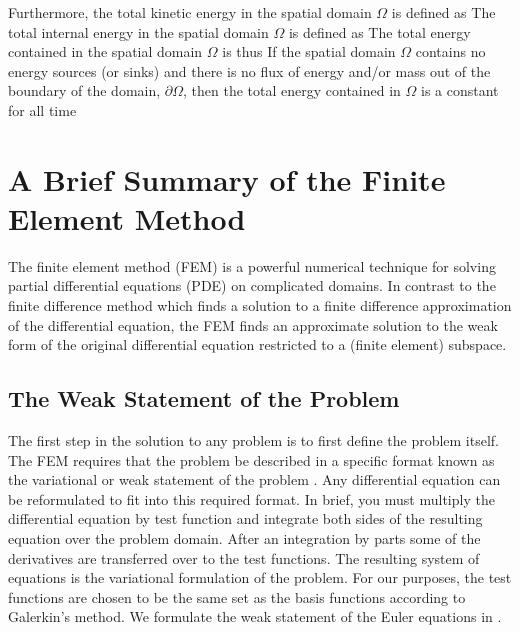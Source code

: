 Furthermore, the total kinetic energy in the spatial domain 
$\Omega$ is defined as
The total internal energy in the spatial domain $\Omega$ is defined
as
The total energy contained in the spatial domain $\Omega$ is thus
If the spatial domain $\Omega$ contains no energy sources (or sinks)
and there is no flux of energy and/or mass out of the boundary of the
domain, $\partial \Omega$, then the total energy contained in 
$\Omega$ is a constant for all time

\section{A Brief Summary of the Finite Element Method}
The finite element method (FEM) is a powerful numerical technique for solving partial differential equations (PDE) on complicated domains. In contrast to the finite difference method which finds a solution to a finite difference approximation of the differential equation, the FEM finds an approximate solution to the weak form of the original differential equation restricted to a (finite element) subspace. 

\subsection{The Weak Statement of the Problem}\label{sec:WeakStatement}
The first step in the solution to any problem is to first define the problem itself. The FEM requires that the problem be described in a specific format known as the variational or weak statement of the problem \cite{Hughes1987}. Any differential equation can be reformulated to fit into this required format. In brief, you must multiply the differential equation by test function and integrate both sides of the resulting equation over the problem domain. After an integration by parts some of the derivatives are transferred over to the test functions. The resulting system of equations is the variational formulation of the problem. For our purposes, the test functions are chosen to be the same set as the basis functions according to Galerkin's method. We formulate the weak statement of the Euler equations in .

